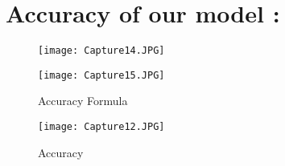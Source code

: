 \section{Accuracy of our model :}
\begin{figure}[h]
	\texttt{[image: Capture14.JPG]}
	\caption{}
	\label{fig:boat1}
\end{figure}
\begin{figure}[h]
	\texttt{[image: Capture15.JPG]}
	\caption{Accuracy Formula}
	\label{fig:boat1}
\end{figure}
\begin{figure}[h]
	\texttt{[image: Capture12.JPG]}
	\caption{Accuracy}
	\label{fig:boat1}
\end{figure}



